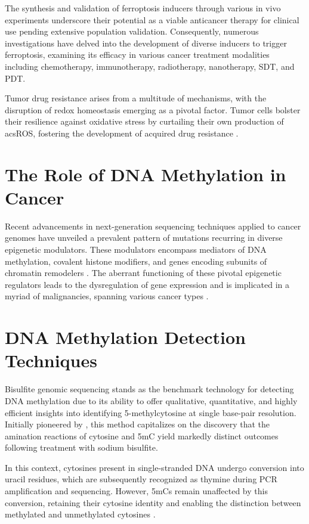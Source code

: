 The synthesis and validation of ferroptosis inducers through various in vivo experiments underscore their potential as a viable anticancer therapy for clinical use pending extensive population validation. Consequently, numerous investigations have delved into the development of diverse inducers to trigger ferroptosis, examining its efficacy in various cancer treatment modalities including chemotherapy, immunotherapy, radiotherapy, nanotherapy, SDT, and PDT.

Tumor drug resistance arises from a multitude of mechanisms, with the disruption of redox homeostasis emerging as a pivotal factor. Tumor cells bolster their resilience against oxidative stress by curtailing their own production of acs{ROS}, fostering the development of acquired drug resistance \citep{ferro_res}.

\section{The Role of DNA Methylation in Cancer}

Recent advancements in next-generation sequencing techniques applied to cancer genomes have unveiled a prevalent pattern of mutations recurring in diverse epigenetic modulators. These modulators encompass mediators of DNA methylation, covalent histone modifiers, and genes encoding subunits of chromatin remodelers \citep{meth_cancer}. The aberrant functioning of these pivotal epigenetic regulators leads to the dysregulation of gene expression and is implicated in a myriad of malignancies, spanning various cancer types \citep{meth_cancer2}.

\section{DNA Methylation Detection Techniques}

Bisulfite genomic sequencing stands as the benchmark technology for detecting DNA methylation due to its ability to offer qualitative, quantitative, and highly efficient insights into identifying 5-methylcytosine at single base-pair resolution. Initially pioneered by \cite{bisulfite_ori}, this method capitalizes on the discovery that the amination reactions of cytosine and \ac{5mC} yield markedly distinct outcomes following treatment with sodium bisulfite.

In this context, cytosines present in single-stranded DNA undergo conversion into uracil residues, which are subsequently recognized as thymine during PCR amplification and sequencing. However, \acsp{5mC} remain unaffected by this conversion, retaining their cytosine identity and enabling the distinction between methylated and unmethylated cytosines \citep{bisulfite2}. 


